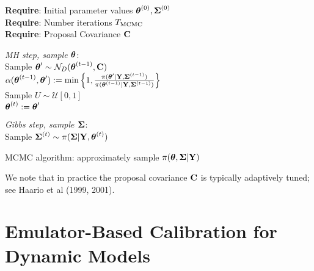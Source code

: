 \documentclass[12pt]{article}
\begin{document}
 \begin{algorithm}[H]
	\SetAlgoLined
	
	\textbf{Require}: Initial parameter values $\boldsymbol{\theta}^{(0)}, \boldsymbol{\Sigma}^{(0)}$ \\
	\textbf{Require}: Number iterations $T_{\text{MCMC}}$ \\
	\textbf{Require}: Proposal Covariance $\mathbf{C}$
		
	\bigskip
	
	 {
	\textit{MH step, sample $\boldsymbol{\theta}$}: \\[.2cm]
	Sample $\boldsymbol{\theta}^\prime \sim \mathcal{N}_{D}(\boldsymbol{\theta}^{(t - 1)}, \mathbf{C})$ \\
	$\alpha(\boldsymbol{\theta}^{(t - 1)}, \boldsymbol{\theta}^\prime) := \min\left\{1, \frac{\pi(\boldsymbol{\theta}^\prime|\mathbf{Y}, \boldsymbol{\Sigma}^{(t-1)})}{\pi(\boldsymbol{\theta}^{(t-1)}|\mathbf{Y}, \boldsymbol{\Sigma}^{(t-1)})} \right\}$ \\

	 Sample $U \sim \mathcal{U}[0, 1]$ \\
	  {
	 	$\boldsymbol{\theta}^{(t)} := \boldsymbol{\theta}^\prime$ \\
	 } 
	
	\bigskip
	
	\textit{Gibbs step, sample $\boldsymbol{\Sigma}$}: \\[.2cm]
	Sample $\boldsymbol{\Sigma}^{(t)} \sim  \pi(\boldsymbol{\Sigma} | \mathbf{Y}, \boldsymbol{\theta}^{(t)})$
}
\caption{MCMC algorithm: approximately sample $\pi(\boldsymbol{\theta}, \boldsymbol{\Sigma}|\mathbf{Y})$}
\end{algorithm}
We note that in practice the proposal covariance $\mathbf{C}$ is typically adaptively tuned; see Haario et al (1999, 2001).  

\section{Emulator-Based Calibration for Dynamic Models}

\end{document}
